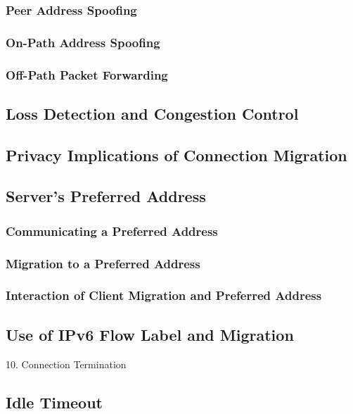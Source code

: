 \documentclass{article}
\begin{document}
\subsubsection{Peer Address Spoofing}

\subsubsection{On-Path Address Spoofing}

\subsubsection{Off-Path Packet Forwarding}

\subsection{Loss Detection and Congestion Control}

\subsection{Privacy Implications of Connection Migration}

\subsection{Server's Preferred Address}

\subsubsection{Communicating a Preferred Address}

\subsubsection{Migration to a Preferred Address}

\subsubsection{Interaction of Client Migration and Preferred Address}

\subsection{Use of IPv6 Flow Label and Migration}

10. Connection Termination

\subsection{Idle Timeout}
\end{document}
